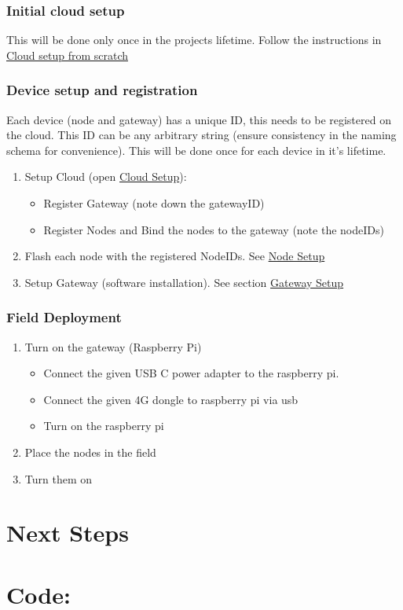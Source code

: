 \documentclass[a4paper,11pt,oneside]{book}
\begin{document}
\subsection{Initial cloud setup}

   This will be done only once in the projects lifetime.
   \noindent
   Follow the instructions in \href{https://github.com/Raghav-intrigue/dfpl-project001/blob/master/documentation/cloud.md}{Cloud setup from scratch}

\subsection{Device setup and registration}

    Each device (node and gateway) has a unique ID, this needs to be registered on the cloud. This ID can be any arbitrary string (ensure consistency in the naming schema for convenience).
    \noindent
    This will be done once for each device in it's lifetime.
    
    \begin{enumerate}
    \item Setup Cloud (open \href{https://github.com/Raghav-intrigue/dfpl-project001/blob/master/documentation/cloud.md}{Cloud Setup}):
	    \begin{itemize}
	    \item Register Gateway (note down the gatewayID)
	    \item Register Nodes and Bind the nodes to the gateway (note the nodeIDs)
	    \end{itemize}
    \item Flash each node with the registered NodeIDs. See \href{https://github.com/Raghav-intrigue/dfpl-project001-node}{Node Setup}
    \item Setup Gateway (software installation). See section \href{https://github.com/Raghav-intrigue/dfpl-project001-gateway}{Gateway Setup}
    \end{enumerate}

\subsection{Field Deployment}
    \begin{enumerate}
    \item Turn on the gateway (Raspberry Pi)
	    \begin{itemize}
	    \item Connect the given USB C power adapter  to the raspberry pi.
	    \item Connect the given 4G dongle to raspberry pi via usb
	    \item Turn on the raspberry pi
	    \end{itemize}
    \item Place the nodes in the field
    \item Turn them on
    \end{enumerate}

\chapter{Next Steps}



\chapter{Code:}


\newpage
{}
\printbibliography
\end{document}
